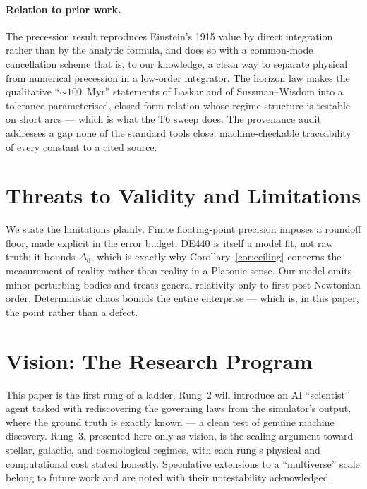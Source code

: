 \documentclass[11pt]{article}
\theoremstyle{definition}
\begin{document}
\paragraph{Relation to prior work.}
The precession result reproduces Einstein's 1915 value by direct integration
rather than by the analytic formula, and does so with a common-mode cancellation
scheme that is, to our knowledge, a clean way to separate physical from
numerical precession in a low-order integrator. The horizon law makes the
qualitative ``$\sim\!100$~Myr'' statements of Laskar and of Sussman--Wisdom into
a tolerance-parameterised, closed-form relation whose regime structure is
testable on short arcs --- which is what the T6 sweep does. The provenance audit
addresses a gap none of the standard tools close: machine-checkable traceability
of every constant to a cited source.

\section{Threats to Validity and Limitations}

We state the limitations plainly. Finite floating-point precision imposes a
roundoff floor, made explicit in the error budget. DE440 is itself a model fit,
not raw truth; it bounds $\Delta_0$, which is exactly why
Corollary~\ref{cor:ceiling} concerns the measurement of reality rather than
reality in a Platonic sense. Our model omits minor perturbing bodies and treats
general relativity only to first post-Newtonian order. Deterministic chaos
bounds the entire enterprise --- which is, in this paper, the point rather than
a defect.

\section{Vision: The Research Program}

This paper is the first rung of a ladder. Rung~2 will introduce an AI ``scientist''
agent tasked with rediscovering the governing laws from the simulator's output,
where the ground truth is exactly known --- a clean test of genuine machine
discovery. Rung~3, presented here only as vision, is the scaling argument toward
stellar, galactic, and cosmological regimes, with each rung's physical and
computational cost stated honestly. Speculative extensions to a ``multiverse''
scale belong to future work and are noted with their untestability acknowledged.
\end{document}
